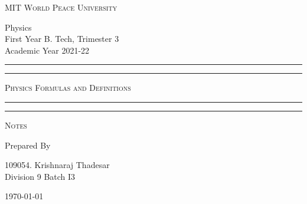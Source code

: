 \documentclass[12pt]{article}
\begin{document}
	
	\begin{titlepage} 
		\centering 
		
		
		\huge\textsc{
			MIT World Peace University
		}\\
	
		\vspace{0.75\baselineskip} %
		
		\LARGE{
			Physics\\
			First Year B. Tech, Trimester 3\\
			Academic Year 2021-22
		}
		
		\vfill %
		
		
		\rule{\textwidth}{1.6pt}\vspace*{-\baselineskip}\vspace*{2pt}
		\rule{\textwidth}{0.6pt}
		\vspace{0.75\baselineskip} %
		
		
		
		\huge{\textsc{
				Physics Formulas and Definitions
			}} \\
		
		
		
		\vspace{0.5\baselineskip} %
		\rule{\textwidth}{0.6pt}\vspace*{-\baselineskip}\vspace*{2.8pt}
		\rule{\textwidth}{1.6pt}
		
		\vspace{1\baselineskip} %

			
		\LARGE\textsc{
			Notes
		} %
		\vfill
		
		
		Prepared By
		\vspace{0.5\baselineskip} %
		
		\Large{
			109054. Krishnaraj Thadesar\\
			\vspace{1cm}
			Division 9 Batch I3
		}
		
		
		\vspace{0.5\baselineskip} %
		\today

	\end{titlepage}
\end{document}
